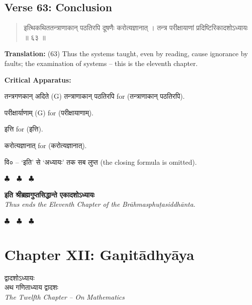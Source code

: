 \documentclass[11pt,a4paper]{article}
\newcommand{\dev}[1]{{\devanagarifont #1}}
\newenvironment{sanskritverse}{%
  \begin{quote}%
  \devanagarifont%
  \setlength{\leftmargin}{2em}%
}{\end{quote}}
\newenvironment{variants}{%
  \small%
  \color{varecolor}%
  \list{}{\leftmargin=2em\itemindent=-1em}%
}{\endlist}
\newcommand{\chapterend}{%
  \begin{center}%
  \textcolor{endmarkcolor}{$\clubsuit$~~$\clubsuit$~~$\clubsuit$}%
  \end{center}%
}
\begin{document}
\subsection*{Verse 63: Conclusion}

\begin{sanskritverse}
\dev{इत्थिकथिततन्त्राणाकान् पठतिरपि दूषणैः करोत्यज्ञानात्} ।
\dev{तन्त्र परीक्षायाणां प्रदिष्टिरिकादशोऽध्यायः ॥ ६३ ॥}
\end{sanskritverse}

\textbf{Translation:} (63) Thus the systems taught, even by reading, cause ignorance 
by faults; the examination of systems -- this is the eleventh chapter.

\textcolor{varecolor}{\textbf{Critical Apparatus:}}
\begin{variants}
\item[63.1] \dev{तन्त्रगणकान् अदिते} (G) \dev{तन्त्राणाकान् पठतिरपि} \dev{for} (\dev{तन्त्राणाकान् पठतिरपि}).
\item[63.2] \dev{परीक्षार्याणाम्} (G) \dev{for} (\dev{परीक्षायाणाम्}).
\item[63.3] \dev{इत्ति} \dev{for} (\dev{इत्ति}).
\item[63.4] \dev{करोत्यज्ञानात्} \dev{for} (\dev{करोत्यज्ञानात्}).
\item[63.5] \dev{वि०} -- \dev{`इति' से `अध्यायः' तक सब लुप्त} (the closing formula is omitted).
\end{variants}

\vspace{0.5cm}
\chapterend
\begin{center}
\dev{\textbf{इति श्रीब्रह्मगुप्तसिद्धान्ते एकादशोऽध्यायः}}\\[0.2cm]
\textit{Thus ends the Eleventh Chapter of the Brāhmasphuṭasiddhānta.}
\end{center}
\chapterend

\newpage

\section*{Chapter XII: Gaṇitādhyāya}

\begin{center}
\dev{द्वादशोऽध्यायः}\\[0.2cm]
\dev{अथ गणिताध्याय द्वादशः}\\[0.3cm]
\textit{The Twelfth Chapter -- On Mathematics}
\end{center}
\end{document}
